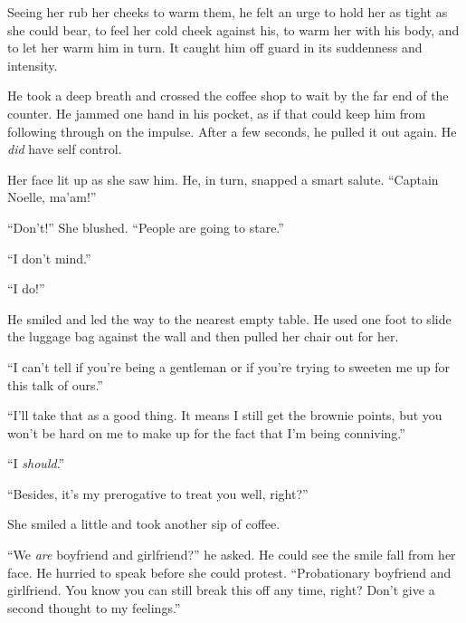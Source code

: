 Seeing her rub her cheeks to warm them, he felt an urge to hold her as tight as she could bear, to feel her cold cheek against his, to warm her with his body, and to let her warm him in turn.  It caught him off guard in its suddenness and intensity.



He took a deep breath and crossed the coffee shop to wait by the far end of the counter.  He jammed one hand in his pocket, as if that could keep him from following through on the impulse.  After a few seconds, he pulled it out again.  He \emph{did} have self control.



Her face lit up as she saw him.  He, in turn, snapped a smart salute.  ``Captain Noelle, ma'am!''



``Don't!''  She blushed.  ``People are going to stare.''



``I don't mind.''



``I do!''



He smiled and led the way to the nearest empty table.  He used one foot to slide the luggage bag against the wall and then pulled her chair out for her.



``I can't tell if you're being a gentleman or if you're trying to sweeten me up for this talk of ours.''



``I'll take that as a good thing.  It means I still get the brownie points, but you won't be hard on me to make up for the fact that I'm being conniving.''



``I \emph{should}.''



``Besides, it's my prerogative to treat you well, right?''



She smiled a little and took another sip of coffee.



``We \emph{are} boyfriend and girlfriend?'' he asked.  He could see the smile fall from her face.  He hurried to speak before she could protest.  ``Probationary boyfriend and girlfriend.  You know you can still break this off any time, right?  Don't give a second thought to my feelings.''




